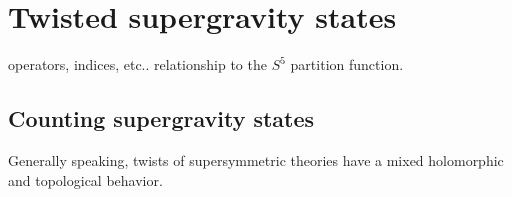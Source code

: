 \documentclass[11pt]{amsart}
\begin{document}
\section{Twisted supergravity states}

operators, indices, etc..
relationship to the $S^5$ partition function.

\subsection{Counting supergravity states}

Generally speaking, twists of supersymmetric theories have a mixed holomorphic and topological behavior.


\parsec[]

\parsec[s:pexp]


%
%
%
%
%
\end{document}
